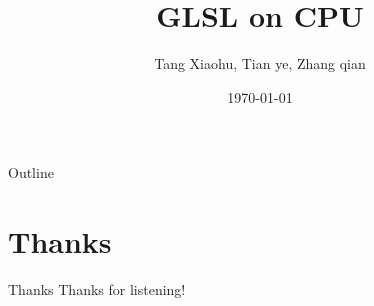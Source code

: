 \documentclass{beamer}
\title[]{GLSL on CPU}
\author{Tang Xiaohu, Tian ye, Zhang qian}
\date{\today}
\begin{document}
\begin{frame}
  \titlepage
\end{frame}

\begin{frame}{Outline}
 \tableofcontents
\end{frame}







\section{Thanks}
\begin{frame}{Thanks}
  Thanks for listening!
\end{frame}
\end{document}
